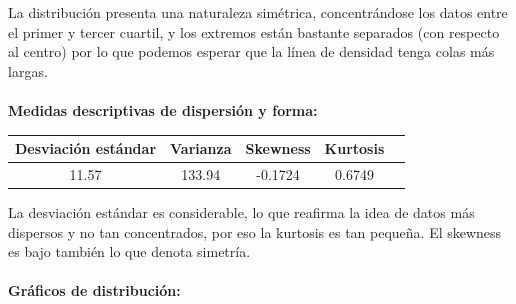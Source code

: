 \documentclass[11pt]{article}
\begin{document}
La distribución presenta una naturaleza simétrica, concentrándose los datos entre el primer y tercer cuartil, y los extremos están bastante separados (con respecto al centro) por lo que podemos esperar que la línea de densidad tenga colas más largas.
\\
\\
\textbf{Medidas descriptivas de dispersión y forma:}

\begin{center}
\begin{tabular}{|c|c|c|c|c|}
    \hline
    Desviación estándar  & Varianza & Skewness & Kurtosis\\ \hline
    11.57 & 133.94 & -0.1724 & 0.6749\\
    \hline
\end{tabular}
\end{center}

La desviación estándar es considerable, lo que reafirma la idea de datos más dispersos y no tan concentrados, por eso la kurtosis es tan pequeña. El skewness es bajo también lo que denota simetría.
\\
\\
\textbf{Gráficos de distribución:}
\\
\end{document}
